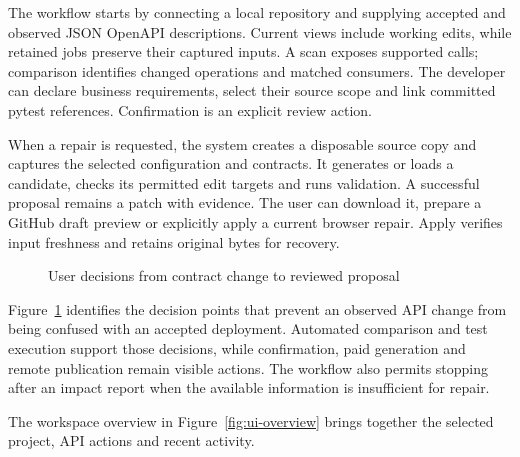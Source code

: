 \documentclass[12pt,a4paper,oneside]{report}
\begin{document}
The workflow starts by connecting a local repository and supplying accepted and observed JSON OpenAPI descriptions. Current views include working edits, while retained jobs preserve their captured inputs. A scan exposes supported calls; comparison identifies changed operations and matched consumers. The developer can declare business requirements, select their source scope and link committed pytest references. Confirmation is an explicit review action.

When a repair is requested, the system creates a disposable source copy and captures the selected configuration and contracts. It generates or loads a candidate, checks its permitted edit targets and runs validation. A successful proposal remains a patch with evidence. The user can download it, prepare a GitHub draft preview or explicitly apply a current browser repair. Apply verifies input freshness and retains original bytes for recovery.

\begin{figure}[htbp]\centering
{}
\caption{User decisions from contract change to reviewed proposal}\label{fig:3.1}
\end{figure}

Figure~\ref{fig:3.1} identifies the decision points that prevent an observed API change from being confused with an accepted deployment. Automated comparison and test execution support those decisions, while confirmation, paid generation and remote publication remain visible actions. The workflow also permits stopping after an impact report when the available information is insufficient for repair.


The workspace overview in Figure~\ref{fig:ui-overview} brings together the selected project, API actions and recent activity.
\end{document}
